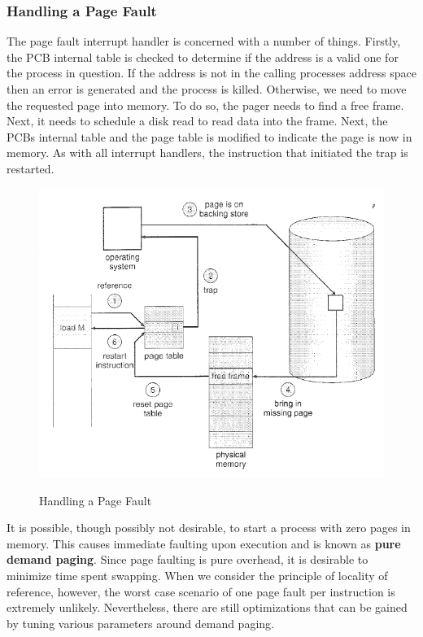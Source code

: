 \documentclass[10pt,a4paper]{article}
\begin{document}
\subsubsection{Handling a Page Fault}
The page fault interrupt handler is concerned with a number of things. Firstly, the PCB internal table is checked to determine if the address is a valid one for the process in question. If the address is not in the calling processes address space then an error is generated and the process is killed. Otherwise, we need to move the requested page into memory. To do so, the pager needs to find a free frame. Next, it needs to schedule a disk read to read data into the frame. Next, the PCBs internal table and the page table is modified to indicate the page is now in memory. As with all interrupt handlers, the instruction that initiated the trap is restarted.
\begin{figure}
\caption{Handling a Page Fault \cite{OSCONCEPTS}}
\begin{center}
\includegraphics[scale=0.45]{../images/page-fault.png}
\label{page-fault}
\end{center}
\end{figure}
It is possible, though possibly not desirable, to start a process with zero pages in memory. This causes immediate faulting upon execution and is known as {\bf pure demand paging}. Since page faulting is pure overhead, it is desirable to minimize time spent swapping. When we consider the principle of locality of reference, however, the worst case scenario of one page fault per instruction is extremely unlikely. Nevertheless, there are still optimizations that can be gained by tuning various parameters around demand paging.
\end{document}
